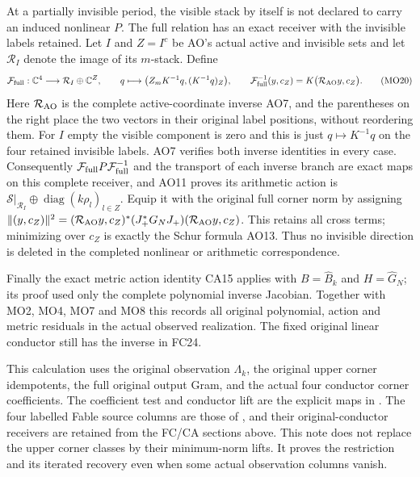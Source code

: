 \documentclass[11pt]{article}
\newcommand{\C}{\mathbb C}
\newcommand{\diag}{\operatorname{diag}}
\begin{document}
At a partially invisible period, the visible stack by itself is
not declared to carry an induced nonlinear $P$. The full relation
has an exact receiver with the invisible labels retained. Let
$I$ and $Z=I^c$ be AO's actual active and invisible sets and let
$\mathcal R_I$ denote the image of its $m$-stack. Define
\[
 \mathcal F_{\rm full}:\C^4\longrightarrow
              \mathcal R_I\oplus\C^Z,\qquad
 q\longmapsto\bigl(Z_mK^{-1}q,(K^{-1}q)_Z\bigr),\qquad
 \mathcal F_{\rm full}^{-1}(y,c_Z)
       =K\bigl(\mathcal R_{\rm AO}y,c_Z\bigr).
 \tag{MO20}
\]
Here $\mathcal R_{\rm AO}$ is the complete active-coordinate
inverse AO7, and the parentheses on the right place the two
vectors in their original label positions, without reordering
them. For $I$ empty the visible component is zero and this is
just $q\mapsto K^{-1}q$ on the four retained invisible labels.
AO7 verifies both inverse identities in every case. Consequently
$\mathcal F_{\rm full}P\mathcal F_{\rm full}^{-1}$ and the
transport of each inverse branch are exact maps on this complete
receiver, and AO11 proves its arithmetic action is
$\mathcal S|_{\mathcal R_I}\oplus\diag(k\rho_l)_{l\in Z}$.
Equip it with the original full corner norm by assigning
$\|(y,c_Z)\|^2=(\mathcal R_{\rm AO}y,c_Z)^*
(J_+^*G_NJ_+)(\mathcal R_{\rm AO}y,c_Z)$.
This retains all cross terms; minimizing over $c_Z$ is exactly
the Schur formula AO13. Thus no invisible direction is deleted
in the completed nonlinear or arithmetic correspondence.

Finally the exact metric action identity CA15 applies with
$B=\widehat B_k$ and $H=\widehat G_N$; its proof used only the
complete polynomial inverse Jacobian. Together with MO2, MO4,
MO7 and MO8 this records all original polynomial, action and
metric residuals in the actual observed realization. The fixed
original linear conductor still has the inverse in FC24.



This calculation uses the original observation $\Lambda_k$, the
original upper corner idempotents, the full original output Gram,
and the actual four conductor corner coefficients. The coefficient
test and conductor lift are the explicit maps in
\cite[O1--3 and O10]{Observe}. The four labelled Fable source
columns are those of \cite{ES488}, and their original-conductor
receivers are retained from the FC/CA sections above. This note does not
replace the upper corner classes by their minimum-norm lifts.
It proves the restriction and its iterated recovery even when
some actual observation columns vanish.
\end{document}
